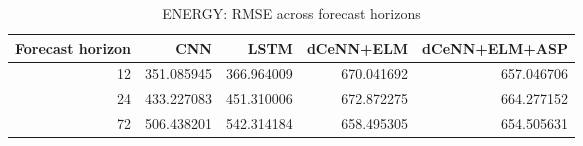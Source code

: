 \begin{table}
\caption{ENERGY: RMSE across forecast horizons}
\begin{tabular}{rrrrr}
\toprule
Forecast horizon & CNN & LSTM & dCeNN+ELM & dCeNN+ELM+ASP \\
\midrule
12 & 351.085945 & 366.964009 & 670.041692 & 657.046706 \\
24 & 433.227083 & 451.310006 & 672.872275 & 664.277152 \\
72 & 506.438201 & 542.314184 & 658.495305 & 654.505631 \\
\bottomrule
\end{tabular}
\end{table}
